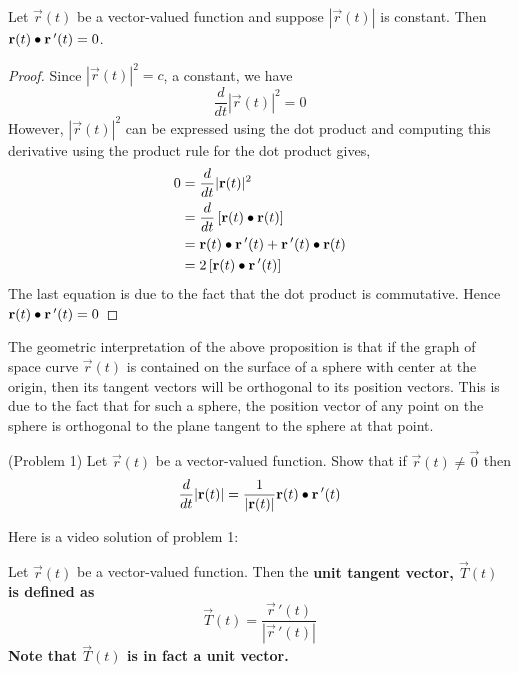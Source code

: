 \documentclass[handout]{ximera}
\begin{document}
\begin{proposition}
Let $\vec r(t)$ be a vector-valued function and suppose $|\vec r(t)|$ is constant. Then $\mathbf r(t) \bullet \mathbf r\,'(t) = 0$.\\
\end{proposition}
\begin{proof}
Since $|\vec r(t)|^2 = c$, a constant, we have
\[
\frac{d}{dt} |\vec r(t)|^2 = 0
\]
However, $|\vec r(t)|^2$ can be expressed using the dot product and computing this derivative using the product rule for the dot product gives,
\begin{align*}
0 &= \frac{d}{dt} |\mathbf r(t)|^2 \\
&= \frac{d}{dt} \left[\mathbf r(t) \bullet \mathbf r(t)\right] \\
  &= \mathbf r(t) \bullet \mathbf r\,'(t) + \mathbf r\,'(t) \bullet \mathbf r(t) \\
  &= 2 \left[\mathbf r(t) \bullet \mathbf r\,'(t)\right]
\end{align*}
The last equation is due to the fact that the dot product is commutative. Hence $\mathbf r(t) \bullet \mathbf r\,'(t) = 0$
\end{proof}

\begin{remark}
The geometric interpretation of the above proposition is that if the graph of space curve $\vec r(t)$ is contained 
on the surface of a sphere with center at the origin,
then its tangent vectors will be orthogonal to its position vectors.  
This is due to the fact that for such a sphere, the position vector of any point on the sphere is 
orthogonal to the plane tangent to the sphere at that point.
\end{remark}

\begin{problem}(Problem 1)
Let $\vec r(t)$ be a vector-valued function. Show that if $\vec r(t) \neq \vec 0$ then 
\[
\frac{d}{dt} |\mathbf r(t)| = \frac{1}{|\mathbf r(t)|} \mathbf r(t) \bullet \mathbf r\,'(t)
\]
\end{problem}

Here is a video solution of problem 1:\\
\begin{foldable}
\end{foldable}




\begin{definition}
Let $\vec r(t)$ be a vector-valued function. Then the \bf{unit tangent vector}, $\vec T(t)$ is defined as
\[
\vec T(t) = \frac{\vec r\,'(t)}{|\vec r\,'(t)|}
\]
Note that $\vec T(t)$ is in fact a unit vector.
\end{definition}
\end{document}
